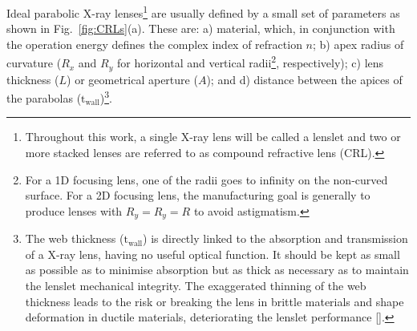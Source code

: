 \begin{refsection}
Ideal parabolic X-ray lenses\footnote{Throughout this work, a single X-ray lens will be called a lenslet and two or more stacked lenses are referred to as compound refractive lens (CRL).} are usually defined by a small set of parameters as shown in Fig.~\ref{fig:CRLs}(a). These are: a) material, which, in conjunction with the operation energy defines the complex index of refraction $n$; b) apex radius of curvature ($R_x$ and $R_y$ for horizontal and vertical radii\footnote{For a 1D focusing lens, one of the radii goes to infinity on the non-curved surface. For a 2D focusing lens, the manufacturing goal is generally to produce lenses with $R_y=R_y=R$ to avoid astigmatism.}, respectively); c) lens thickness ($L$) or geometrical aperture ($A$); and d) distance between the apices of the parabolas ($\text{t}_{\text{wall}}$)\footnote{The web thickness ($\text{t}_{\text{wall}}$) is directly linked to the absorption and transmission of a X-ray lens, having no useful optical function. It should be kept as small as possible as to minimise absorption but as thick as necessary as to maintain the lenslet mechanical integrity. The exaggerated thinning of the web thickness leads to the risk or breaking the lens in brittle materials and shape deformation in ductile materials, deteriorating the lenslet performance [\cite{Lengeler1998}].}.


\end{refsection}
